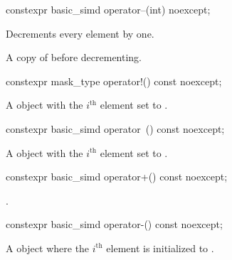 \begin{itemdecl}
constexpr basic_simd operator--(int) noexcept;
\end{itemdecl}

\begin{itemdescr}
  \pnum{}

  \pnum\effects
  Decrements every element by one.

  \pnum\returns
  A copy of  before decrementing.
\end{itemdescr}

\begin{itemdecl}
constexpr mask_type operator!() const noexcept;
\end{itemdecl}

\begin{itemdescr}
  \pnum{}

  \pnum\returns
  A  object with the $i^\text{th}$ element set to 
  \foralli.
\end{itemdescr}

\begin{itemdecl}
constexpr basic_simd operator~() const noexcept;
\end{itemdecl}

\begin{itemdescr}
  \pnum{}

  \pnum\returns
  A  object with the $i^\text{th}$ element set to 
  \foralli.
\end{itemdescr}

\begin{itemdecl}
constexpr basic_simd operator+() const noexcept;
\end{itemdecl}

\begin{itemdescr}
  \pnum{}

  \pnum\returns
  .
\end{itemdescr}

\begin{itemdecl}
constexpr basic_simd operator-() const noexcept;
\end{itemdecl}

\begin{itemdescr}
  \pnum{}

  \pnum\returns
  A  object where the $i^\text{th}$ element is initialized to
   \foralli.
\end{itemdescr}

